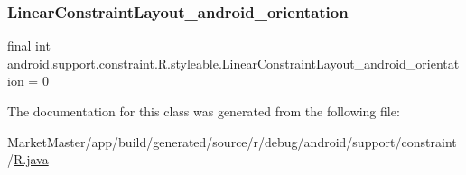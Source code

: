 \subsubsection{\texorpdfstring{Linear\+Constraint\+Layout\+\_\+android\+\_\+orientation}{LinearConstraintLayout\_android\_orientation}}
{\footnotesize\ttfamily final int android.\+support.\+constraint.\+R.\+styleable.\+Linear\+Constraint\+Layout\+\_\+android\+\_\+orientation = 0\hspace{0.3cm}{\ttfamily [static]}}



The documentation for this class was generated from the following file\+:\begin{DoxyCompactItemize}
\item 
Market\+Master/app/build/generated/source/r/debug/android/support/constraint/\mbox{\hyperlink{debug_2android_2support_2constraint_2R_8java}{R.\+java}}\end{DoxyCompactItemize}
